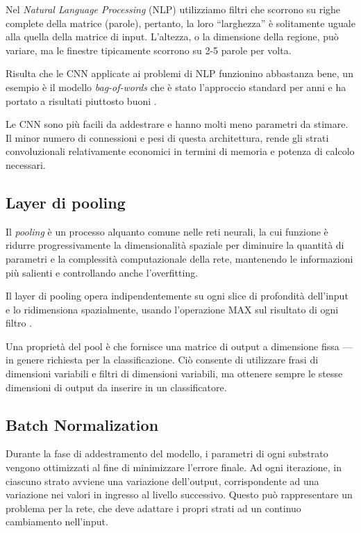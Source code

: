 Nel \emph{Natural Language Processing} (NLP) utilizziamo filtri che scorrono su righe complete della matrice (parole), pertanto, la loro ``larghezza'' è solitamente uguale alla quella della matrice di input. L'altezza, o la dimensione della regione, può variare, ma le finestre tipicamente scorrono su 2-5 parole per volta. 

Risulta che le CNN applicate ai problemi di NLP funzionino abbastanza bene, un esempio è il modello \emph{bag-of-words} che è stato l'approccio standard per anni e ha portato a risultati piuttosto buoni \cite{wallach2006topic}.

Le CNN sono più facili da addestrare e hanno molti meno parametri da stimare. 
Il minor numero di connessioni e pesi di questa architettura, rende gli strati convoluzionali relativamente economici in termini di memoria e potenza di calcolo necessari.

\subsection{Layer di pooling}
\label{subsec:maxpool}

Il \emph{pooling} è un processo alquanto comune nelle reti neurali, la cui funzione è ridurre progressivamente la dimensionalità spaziale per diminuire la quantità di parametri e la complessità computazionale della rete, mantenendo le informazioni più salienti e controllando anche l'overfitting.

Il layer di pooling opera indipendentemente su ogni slice di profondità dell'input e lo ridimensiona spazialmente, usando l'operazione MAX sul risultato di ogni filtro \cite{karpathy2016cs231n}. 

Una proprietà del pool è che fornisce una matrice di output a dimensione fissa --- in genere richiesta per la classificazione. Ciò consente di utilizzare frasi di dimensioni variabili e filtri di dimensioni variabili, ma ottenere sempre le stesse dimensioni di output da inserire in un classificatore.

\subsection{Batch Normalization}
\label{subsec:normalization}

Durante la fase di addestramento del modello, i parametri di ogni substrato vengono ottimizzati al fine di minimizzare l'errore finale.
Ad ogni iterazione, in ciascuno strato avviene una variazione dell'output, corrispondente ad una variazione nei valori in ingresso al livello successivo.
Questo può rappresentare un problema per la rete, che deve adattare i propri strati ad un continuo cambiamento nell'input. 

